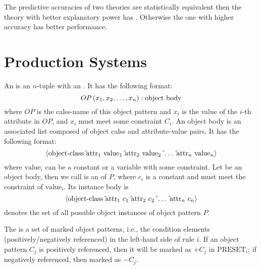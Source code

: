 \begin{defi}
The predictive accuracies of two theories are statistically equivalent then the theory with better explanatory power has . Otherwise the one with higher accuracy has better performance.
\cite{conf/ijcai/SrinivasanKMS97}
\end{defi}

\section{Production Systems}

\begin{defi}
An  is an $n$-tuple with an . It has the following format:
\begin{equation}
OP\left(x_1,x_2,\ldots,x_n\right):\mbox{object body}
\end{equation}
where $OP$ is the calss-name of this object pattern and $x_i$ is the value of the $i$-th attribute in $OP$, and $x_i$ must meet some constraint $C_i$. An object body is an associated list composed of object calss and attribute-value pairs. It has the following format:
\begin{equation}
\tuple{\mbox{object-class}\ \hat{}\mbox{attr}_1\ \mbox{value}_1\ \hat{}\mbox{attr}_2\ \mbox{value}_2\ \hat{}\ldots\ \hat{}\mbox{attr}_n\ \mbox{value}_n}
\end{equation}
where $\mbox{value}_i$ can be a constant or a variable with some constraint. Let  be an object body, then we call  is an  of $P$, where $c_i$ is a constant and must meet the constraint of $\mbox{value}_i$. Its instance body is
\begin{equation}
\tuple{\mbox{object-class}\ \hat{}\mbox{attr}_1\ c_1\ \hat{}\mbox{attr}_2\ c_2\ \hat{}\ldots\ \hat{}\mbox{attr}_n\ c_n}
\end{equation}
 denotes the set of all possible object instances of object pattern $P$.
\cite{conf/ijcai/HsuW89}
\end{defi}

\begin{defi}
The  is a set of marked object patterns, i.e., the condition elements (positively/negatively referenced) in the left-hand side of rule $i$. If an object pattern $C_j$ is positively referenced, then it will be marked as $+C_j$ in $\mbox{PRESET}_i$; if negatively referenced, then marked as $-C_j$.
\cite{conf/ijcai/HsuW89}
\end{defi}

